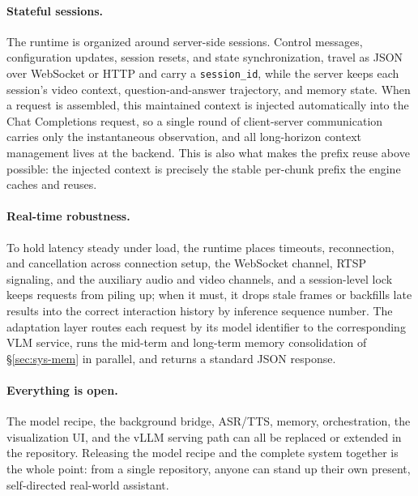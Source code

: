 
\paragraph{\textbf{Stateful sessions.}} The runtime is organized around server-side sessions. Control messages, configuration updates, session resets, and state synchronization, travel as JSON over WebSocket or HTTP and carry a \texttt{session\_id}, while the server keeps each session's video context, question-and-answer trajectory, and memory state. When a request is assembled, this maintained context is injected automatically into the Chat Completions request, so a single round of client-server communication carries only the instantaneous observation, and all long-horizon context management lives at the backend. This is also what makes the prefix reuse above possible: the injected context is precisely the stable per-chunk prefix the engine caches and reuses.

\paragraph{\textbf{Real-time robustness.}} To hold latency steady under load, the runtime places timeouts, reconnection, and cancellation across connection setup, the WebSocket channel, RTSP signaling, and the auxiliary audio and video channels, and a session-level lock keeps requests from piling up; when it must, it drops stale frames or backfills late results into the correct interaction history by inference sequence number. The adaptation layer routes each request by its model identifier to the corresponding VLM service, runs the mid-term and long-term memory consolidation of §\ref{sec:sys-mem} in parallel, and returns a standard JSON response.


\paragraph{\textbf{Everything is open.}} The model recipe, the background bridge, ASR/TTS, memory, orchestration, the visualization UI, and the vLLM serving path can all be replaced or extended in the repository. Releasing the model recipe and the complete system together is the whole point: from a single repository, anyone can stand up their own present, self-directed real-world assistant. 
